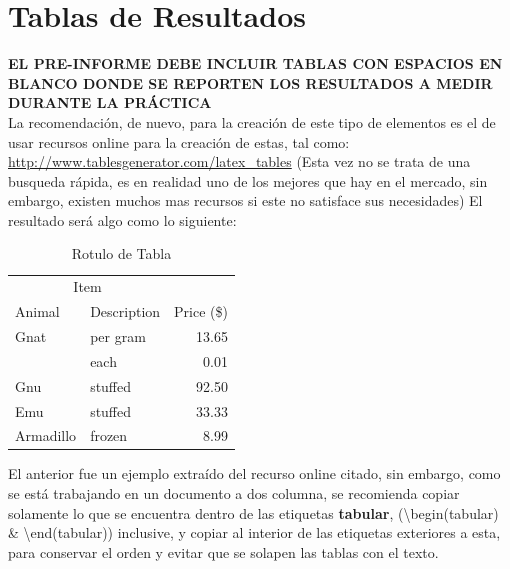 \documentclass[a4paper, twocolumn, 11pt]{article}
\begin{document}
\section{Tablas de Resultados}
\label{sec:tablas}
\textbf{EL PRE-INFORME DEBE INCLUIR TABLAS CON ESPACIOS EN BLANCO DONDE SE REPORTEN LOS RESULTADOS A MEDIR DURANTE LA PRÁCTICA}\\
La recomendación, de nuevo, para la creación de este tipo de elementos es el de usar recursos online para la creación de estas, tal como: \url{http://www.tablesgenerator.com/latex_tables} (Esta vez no se trata de una busqueda rápida, es en realidad uno de los mejores que hay en el mercado, sin embargo, existen muchos mas recursos si este no satisface sus necesidades)
El resultado será algo como lo siguiente:\\
\begin{table}[H]
\centering
\label{tab:tabla1}
\begin{adjustbox}{max width=\linewidth}
\begin{tabular}{llr}
\hline
\multicolumn{2}{c}{Item} &            \\ \cline{1-2}
Animal     & Description & Price (\$) \\ \hline
Gnat       & per gram    & 13.65      \\
           & each        & 0.01       \\
Gnu        & stuffed     & 92.50      \\
Emu        & stuffed     & 33.33      \\
Armadillo  & frozen      & 8.99       \\ \hline
\end{tabular}
\end{adjustbox}
\caption{Rotulo de Tabla}
\end{table}
El anterior fue un ejemplo extraído del recurso online citado, sin embargo, como se está trabajando en un documento a dos columna, se recomienda copiar solamente lo que se encuentra dentro de las etiquetas \textbf{tabular}, (\textbackslash begin(tabular) \& \textbackslash end(tabular)) inclusive, y copiar al interior de las etiquetas exteriores a esta, para conservar el orden y evitar que se solapen las tablas con el texto.
\end{document}
